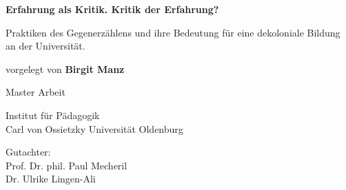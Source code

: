 \begin{titlepage}
    \begin{center}
        \vspace*{1cm}
        
        \Huge
        \textbf{Erfahrung als Kritik. Kritik der Erfahrung?}
        
        \vspace{0.5cm}
        \LARGE
Praktiken des Gegenerzählens und ihre Bedeutung für eine dekoloniale Bildung an der Universität.
        
        \vspace{1.5cm}
        
        vorgelegt von \textbf{Birgit Manz}
        
        \vfill
       
        Master Arbeit
                
        \vspace{0.8cm}
     
        
        \Large
        Institut für Pädagogik\\
        Carl von Ossietzky Universität Oldenburg\\
        \date{24.07.2017}
        \vspace{1.5cm} 
        Gutachter: \\[0.75em]
          Prof. Dr. phil. Paul Mecheril
          \\[0.2em]
          Dr. Ulrike Lingen-Ali

        \end{center}

\end{titlepage}


